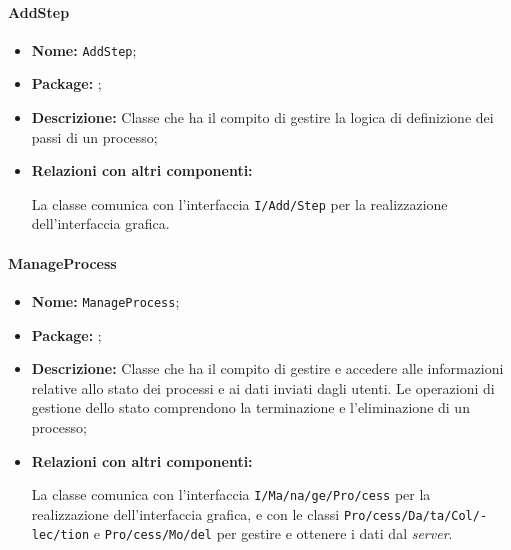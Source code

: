 \paragraph{AddStep}
\begin{flushleft}
\begin{itemize}
\item \textbf{Nome:} \texttt{AddStep};
\item \textbf{Package:} \texttt{\logicAdmin{}};
\item \textbf{Descrizione:} Classe che ha il compito di gestire la logica di definizione dei passi di un processo;
\item \textbf{Relazioni con altri componenti:}
\begin{sloppypar}
La classe comunica con l'interfaccia \texttt{\viewAdmin{}I\fshyp{}Add\fshyp{}Step} per la realizzazione dell'interfaccia grafica.
\end{sloppypar}
\end{itemize}
\end{flushleft}

\paragraph{ManageProcess}
\begin{flushleft}
\begin{itemize}
\item \textbf{Nome:} \texttt{ManageProcess};
\item \textbf{Package:} \texttt{\logicAdmin{}};
\item \textbf{Descrizione:} Classe che ha il compito di gestire e accedere alle informazioni relative allo stato dei processi e ai dati inviati dagli utenti. Le operazioni di gestione dello stato comprendono la terminazione e l'eliminazione di un processo;
\item \textbf{Relazioni con altri componenti:}
\begin{sloppypar}
La classe comunica con l'interfaccia \texttt{\viewAdmin{}I\fshyp{}Ma\fshyp{}na\fshyp{}ge\fshyp{}Pro\fshyp{}cess} per la realizzazione dell'interfaccia grafica, e con le classi \texttt{\collection{}Pro\fshyp{}cess\fshyp{}Da\fshyp{}ta\fshyp{}Col\fshyp{}lec\fshyp{}tion} e \texttt{\model{}Pro\fshyp{}cess\fshyp{}Mo\fshyp{}del} per gestire e ottenere i dati dal \textit{server}.
\end{sloppypar}
\end{itemize}
\end{flushleft}

